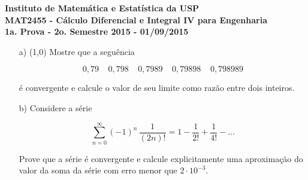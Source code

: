 \documentclass[12pt,a4paper]{article}
\begin{document}
\newpage

\begin{center}
\textbf{Instituto de Matemática e Estatística da USP\\
MAT2455 - Cálculo Diferencial e Integral IV para Engenharia\\}
\textbf{1a. Prova - 2o. Semestre 2015 - 01/09/2015}
\end{center}


\begin{itemize}
	\item[a)] (1,0) Mostre que a seguência
	
	$$0,79 \;\;\;\; 0,798 \;\;\;\; 0,7989 \;\;\;\; 0,79898 \;\;\;\; 0,798989$$
	
	é convergente e calcule o valor de seu limite como razão entre dois inteiros.
	
	\item[b)] Considere a série
	
	$$\displaystyle\sum_{n=0}^\infty (-1)^n \, \frac{1}{(2n)!} = 1 - \frac{1}{2!} + \frac{1}{4!} - ...$$
	
    Prove que a série é convergente e calcule explicitamente uma aproximação do valor da soma da série com erro menor que $2 \cdot 10^{-3}$.
\end{itemize}
\end{document}
